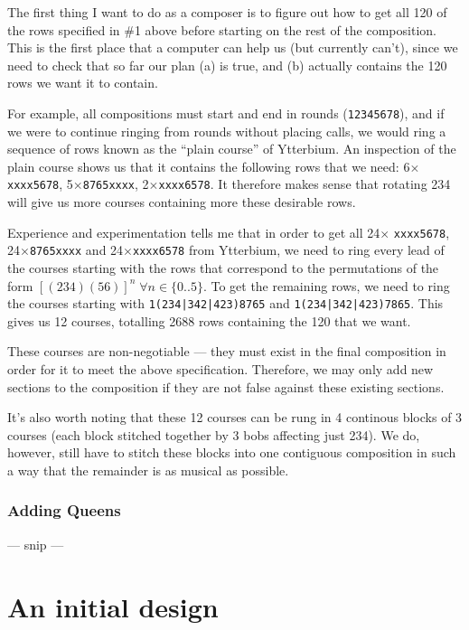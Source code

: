 \documentclass[12pt]{article}
\newcommand{\row}[1]{\texttt{#1}}
\begin{document}
The first thing I want to do as a composer is to figure out how to get all 120 of the rows specified
in \#1 above before starting on the rest of the composition.  This is the first place that a computer
can help us (but currently can't), since we need to check that so far our plan (a) is true, and (b)
actually contains the 120 rows we want it to contain.

For example, all compositions must start and end in rounds (\row{12345678}), and if we were to
continue ringing from rounds without placing calls, we would ring a sequence of rows known as the
``plain course'' of Ytterbium.  An inspection of the plain course shows us that it contains the
following rows that we need: 6$\times$\row{xxxx5678}, 5$\times$\row{8765xxxx},
2$\times$\row{xxxx6578}.  It therefore makes sense that rotating 234 will give us more courses
containing more these desirable rows.

Experience and experimentation tells me that in order to get all 24$\times$ \row{xxxx5678},
24$\times$\row{8765xxxx} and 24$\times$\row{xxxx6578} from Ytterbium, we need to ring every lead of
the courses starting with the rows that correspond to the permutations of the form
${[(234)(56)]}^n \; \forall n \in \{0..5\}$.  To get the remaining rows, we need to ring the
courses starting with \row{1(234|342|423)8765} and \row{1(234|342|423)7865}.  This gives us 12
courses, totalling 2688 rows containing the 120 that we want.

These courses are non-negotiable --- they must exist in the final composition in order for it to
meet the above specification.  Therefore, we may only add new sections to the composition if they
are not false against these existing sections.

It's also worth noting that these 12 courses can be rung in 4 continous blocks of 3 courses (each
block stitched together by 3 bobs affecting just 234).  We do, however, still have to stitch these
blocks into one contiguous composition in such a way that the remainder is as musical as possible.

\subsubsection{Adding Queens}

--- snip ---



\pagebreak

\section{An initial design}
\end{document}
